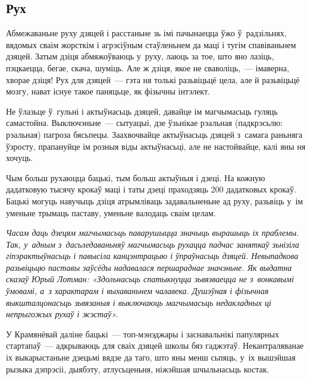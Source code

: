 \subsection*{Рух}

Абмежаваньне руху дзяцей і расстаньне зь імі пачынаецца ўжо ў~радзільнях, вядомых сваім жорсткім і агрэсіўным стаўленьнем да маці і тугім спавіваньнем дзяцей. Затым дзіця абмяжоўваюць у~руху, лаюць за тое, што яно лазіць, пэцкаецца, бегае, скача, шуміць. Але ж дзіця, якое не сваволіць,~--- імаверна, хворае дзіця! Рух для дзяцей~--- гэта ня толькі разьвіцьцё цела, але й разьвіцьцё мозгу, нават існуе такое паняцьце, як фізычны інтэлект.


Не ўлазьце ў~гульні і актыўнасьць дзяцей, давайце ім магчымасьць гуляць самастойна. Выключэньне~--- сытуацыі, дзе ўзьнікае рэальная (падкрэсьлю: рэальная) пагроза бясьпецы. Заахвочвайце актыўнасьць дзяцей з~самага раньняга ўзросту, прапануйце ім розныя віды актыўнасьці, але не настойвайце, калі яны ня хочуць. 


Чым больш рухаюцца бацькі, тым больш актыўныя і дзеці. На кожную дадатковую тысячу крокаў маці і таты дзеці праходзяць 200 дадатковых крокаў. Бацькі могуць навучыць дзіця атрымліваць задавальненьне ад руху, разьвіць у~ім уменьне трымаць паставу, уменьне валодаць сваім целам. 

\emph{Часам даць дзецям магчымасьць паварушыцца значыць вырашыць іх праблемы. Так, у~адным з~дасьледаваньняў магчымасьць рухацца падчас заняткаў зьнізіла гіпэрактыўнасьць і павысіла канцэнтрацыю і ўпраўнасьць дзяцей. Невыпадкова разьвіцьцю паставы заўсёды надавалася першараднае значэньне. Як выдатна сказаў Юрый Лотман: «Здольнасьць спатыкнуцца зьвязваецца не з~вонкавымі ўмовамі, а~з характарам і выхаваньнем чалавека. Душэўная і фізычная выкшталцонасьць зьвязаныя і выключаюць магчымасьць недакладных ці непрыгожых рухаў і жэстаў».}

У Крамянёвай даліне бацькі~--- топ-мэнэджары і заснавальнікі папулярных стартапаў~--- адкрываюць для сваіх дзяцей школы бяз гаджэтаў. Некантраляванае іх выкарыстаньне дзецьмі вядзе да таго, што яны менш сьпяць, у~іх вышэйшая рызыка дэпрэсіі, дыябэту, атлусьценьня, ніжэйшая шчыльнасьць костак.

